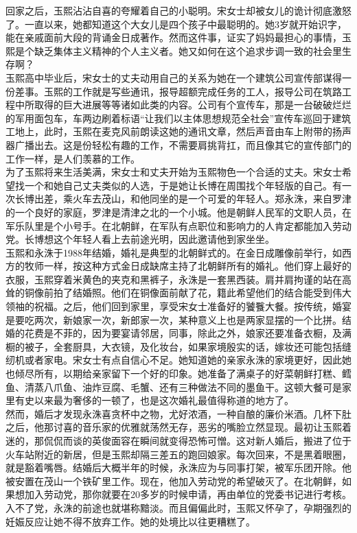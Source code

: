 \begin{multicols}{\theparacolNo}
回家之后，玉熙沾沾自喜的夸耀着自己的小聪明。宋女士却被女儿的诡计彻底激怒了。一直以来，她都知道这个大女儿是四个孩子中最聪明的。她3岁就开始识字，能在亲戚面前大段的背诵金日成著作。然而这件事，证实了妈妈最担心的事情，玉熙是个缺乏集体主义精神的个人主义者。她又如何在这个追求步调一致的社会里生存啊？\\

玉熙高中毕业后，宋女士的丈夫动用自己的关系为她在一个建筑公司宣传部谋得一份差事。玉熙的工作就是写些通讯，报导超额完成任务的工人，报导公司在筑路工程中所取得的巨大进展等等诸如此类的内容。公司有个宣传车，那是一台破破烂烂的军用面包车，车两边刷着标语“让我们以主体思想规范全社会”宣传车巡回于建筑工地上，此时，玉熙在麦克风前朗读这她的通讯文章，然后声音由车上附带的扬声器广播出去。这是份轻松有趣的工作，不需要肩挑背扛，而且像其它的宣传部门的工作一样，是人们羡慕的工作。\\

为了玉熙将来生活美满，宋女士和丈夫开始为玉熙物色一个合适的丈夫。宋女士希望找一个和她自己丈夫类似的人选，于是她让长博在周围找个年轻版的自己。有一次长博出差，乘火车去茂山，和他同坐的是一个可爱的年轻人。郑永洙，来自罗津的一个良好的家庭，罗津是清津之北的一个小城。他是朝鲜人民军的文职人员，在军乐队里是个小号手。在北朝鲜，在军队有点职位和影响力的人肯定都能加入劳动党。长博想这个年轻人看上去前途光明，因此邀请他到家坐坐。\\

玉熙和永洙于1988年结婚，婚礼是典型的北朝鲜式的。在金日成雕像前举行，如西方的牧师一样，按这种方式金日成缺席主持了北朝鲜所有的婚礼。他们穿上最好的衣服，玉熙穿着米黄色的夹克和黑裤子，永洙是一套黑西装。肩并肩拘谨的站在高耸的铜像前拍了结婚照。他们在铜像面前献了花，籍此希望他们的结合能受到伟大领袖的祝福。之后，他们回到家里，享受宋女士准备好的饕餮大餐。按传统，婚宴是要吃两次，新娘家一次，新郎家一次，某种意义上也是两家显摆的一个比拼。结婚的花费是不菲的，因为要宴请邻居，同事，除此之外，娘家还要准备衣橱，及满橱的被子，全套厨具，大衣镜，及化妆台，如果家境殷实的话，嫁妆还可能包括缝纫机或者家电。宋女士有点自信心不足。她知道她的亲家永洙的家境更好，因此她也倾尽所有，以期给亲家留下一个好的印象。她准备了满桌子的好菜朝鲜打糕、鳕鱼、清蒸八爪鱼、油炸豆腐、毛蟹、还有三种做法不同的墨鱼干。这顿大餐可是家里有史以来最为奢侈的一顿了，也是这次婚礼最值得称道的地方了。\\

然而，婚后才发现永洙喜贪杯中之物，尤好浓酒，一种自酿的廉价米酒。几杯下肚之后，他那讨喜的音乐家的优雅就荡然无存，恶劣的嘴脸立然显现。最初让玉熙着迷的，那侃侃而谈的英俊面容在瞬间就变得恐怖可憎。这对新人婚后，搬进了位于火车站附近的新居，但是玉熙却隔三差五的跑回娘家。每次回来，不是黑着眼圈，就是豁着嘴唇。结婚后大概半年的时候，永洙应为与同事打架，被军乐团开除。他被安置在茂山一个铁矿里工作。现在，他加入劳动党的希望破灭了。在北朝鲜，如果想加入劳动党，那你就要在20多岁的时候申请，再由单位的党委书记进行考核。入不了党，永洙的前途也就堪称黯淡。而且偏偏此时，玉熙又怀孕了，孕期强烈的妊娠反应让她不得不放弃工作。她的处境比以往更糟糕了。\\


\end{multicols}

